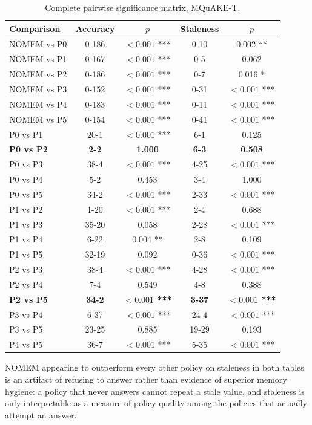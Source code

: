 \begin{table}[H]
\centering
\caption{Complete pairwise significance matrix, MQuAKE-T.}
\label{tab:sig-mq}
\small
\setlength{\tabcolsep}{4pt}
\begin{tabular}{lcccc}
\toprule
Comparison & Accuracy & $p$ & Staleness & $p$ \\
\midrule
NOMEM vs P0 & 0-186 & $<0.001$ *** & 0-10 & 0.002 ** \\
NOMEM vs P1 & 0-167 & $<0.001$ *** & 0-5 & 0.062 \\
NOMEM vs P2 & 0-186 & $<0.001$ *** & 0-7 & 0.016 * \\
NOMEM vs P3 & 0-152 & $<0.001$ *** & 0-31 & $<0.001$ *** \\
NOMEM vs P4 & 0-183 & $<0.001$ *** & 0-11 & $<0.001$ *** \\
NOMEM vs P5 & 0-154 & $<0.001$ *** & 0-41 & $<0.001$ *** \\
P0 vs P1 & 20-1 & $<0.001$ *** & 6-1 & 0.125 \\
\textbf{P0 vs P2} & \textbf{2-2} & \textbf{1.000} & \textbf{6-3} & \textbf{0.508} \\
P0 vs P3 & 38-4 & $<0.001$ *** & 4-25 & $<0.001$ *** \\
P0 vs P4 & 5-2 & 0.453 & 3-4 & 1.000 \\
P0 vs P5 & 34-2 & $<0.001$ *** & 2-33 & $<0.001$ *** \\
P1 vs P2 & 1-20 & $<0.001$ *** & 2-4 & 0.688 \\
P1 vs P3 & 35-20 & 0.058 & 2-28 & $<0.001$ *** \\
P1 vs P4 & 6-22 & 0.004 ** & 2-8 & 0.109 \\
P1 vs P5 & 32-19 & 0.092 & 0-36 & $<0.001$ *** \\
P2 vs P3 & 38-4 & $<0.001$ *** & 4-28 & $<0.001$ *** \\
P2 vs P4 & 7-4 & 0.549 & 4-8 & 0.388 \\
\textbf{P2 vs P5} & \textbf{34-2} & \textbf{$<0.001$ ***} & \textbf{3-37} & \textbf{$<0.001$ ***} \\
P3 vs P4 & 6-37 & $<0.001$ *** & 24-4 & $<0.001$ *** \\
P3 vs P5 & 23-25 & 0.885 & 19-29 & 0.193 \\
P4 vs P5 & 36-7 & $<0.001$ *** & 5-35 & $<0.001$ *** \\
\bottomrule
\end{tabular}
\end{table}

NOMEM appearing to outperform every other policy on staleness in both tables is an artifact of refusing to answer rather than evidence of superior memory hygiene: a policy that never answers cannot repeat a stale value, and staleness is only interpretable as a measure of policy quality among the policies that actually attempt an answer.
